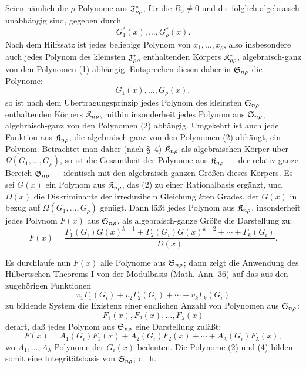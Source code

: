 Seien nämlich die $\rho$ Polynome aus $\mathfrak{J}^*_{\rho\rho}$, für die $R_0\ne0$ und die folglich algebraisch unabhängig sind, gegeben durch
\begin{equation}
  G_1^*(x),\ldots,G_\rho^*(x).
\tag{1}
\end{equation}
Nach dem Hilfssatz ist jedes beliebige Polynom von $x_1,
\ldots,x_\rho$, also insbesondere auch jedes Polynom des kleinsten $\mathfrak{J}^*_{\rho\rho}$ enthaltenden Körpers $\mathfrak{K}^*_{\rho\rho}$, algebraisch-ganz von den Polynomen (1) abhängig. Entsprechen diesen daher in $\mathfrak{S}_{n\rho}$ die Polynome:
\begin{equation}
  G_1(x),\ldots,G_\rho(x),
\tag{2}
\end{equation}
so ist nach dem Übertragungsprinzip jedes Polynom des kleinsten $\mathfrak{S}_{n\rho}$ enthaltenden Körpers $\mathfrak{K}_{n\rho}$, mithin insonderheit jedes Polynom aus $\mathfrak{S}_{n\rho}$, algebraisch-ganz von den Polynomen (2) abhängig. Umgekehrt ist auch jede Funktion aus $\mathfrak{K}_{n\rho}$, die algebraisch-ganz von den Polynomen (2) abhängt, ein Polynom. Betrachtet man daher (nach \S\ 4) $\mathfrak{K}_{n\rho}$ als algebraischen Körper über $\Omega(G_1,
\ldots,G_\rho)$, so ist die Gesamtheit der Polynome aus $\mathfrak{K}_{n\rho}$ --- der relativ-ganze Bereich $\mathfrak{G}_{n\rho}$ --- identisch mit den algebraisch-ganzen Größen dieses Körpers. Es sei $G(x)$ ein Polynom aus $\mathfrak{K}_{n\rho}$, das (2) zu einer Rationalbasis ergänzt, und $D(x)$ die Diskriminante der irreduzibeln Gleichung $k$ten Grades, der $G(x)$ in bezug auf $\Omega(G_1,
\ldots,G_\rho)$ genügt. Dann läßt jedes Polynom aus $\mathfrak{K}_{n\rho}$, insonderheit jedes Polynom $F(x)$ aus $\mathfrak{S}_{n\rho}$, als algebraisch-ganze Größe die Darstellung zu:
\begin{equation}
  F(x)=\frac{\Gamma_1(G_i)G(x)^{k-1}+\Gamma_2(G_i)G(x)^{k-2}+\cdots+\Gamma_k(G_i)}{D(x)}.
\tag{3}
\end{equation}

Es durchlaufe nun $F(x)$ alle Polynome aus $\mathfrak{S}_{n\rho}$; dann zeigt die Anwendung des Hilbertschen Theorems I von der Modulbasis (Math. Ann. 36) auf das aus den zugehörigen Funktionen
\[
  v_1\Gamma_1(G_i)+v_2\Gamma_2(G_i)+\cdots+v_k\Gamma_k(G_i)
\]
zu bildende System die Existenz einer endlichen Anzahl von Polynomen aus $\mathfrak{S}_{n\rho}$:
\begin{equation}
  F_1(x),F_2(x),\ldots,F_\lambda(x)
\tag{4}
\end{equation}
derart, daß jedes Polynom aus $\mathfrak{S}_{n\rho}$ eine Darstellung zuläßt:
\begin{equation}
  F(x)=A_1(G_i)F_1(x)+A_2(G_i)F_2(x)+\cdots+A_\lambda(G_i)F_\lambda(x),
\tag{5}
\end{equation}
wo $A_1,
\ldots,A_\lambda$ Polynome der $G_i(x)$ bedeuten. Die Polynome (2) und (4) bilden somit eine Integritätsbasis von $\mathfrak{S}_{n\rho}$; d.~h.

